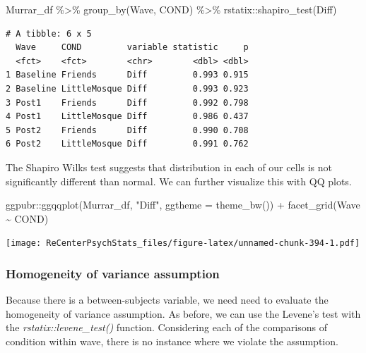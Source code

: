 \documentclass[
  11pt,
]{book}
\newenvironment{Shaded}{\begin{snugshade}}{\end{snugshade}}
\newcommand{\AttributeTok}[1]{\textcolor[rgb]{0.77,0.63,0.00}{#1}}
\newcommand{\FunctionTok}[1]{\textcolor[rgb]{0.00,0.00,0.00}{#1}}
\newcommand{\NormalTok}[1]{#1}
\newcommand{\SpecialCharTok}[1]{\textcolor[rgb]{0.00,0.00,0.00}{#1}}
\newcommand{\StringTok}[1]{\textcolor[rgb]{0.31,0.60,0.02}{#1}}
\begin{document}
\begin{Shaded}
\begin{Highlighting}[]
\NormalTok{Murrar\_df }\SpecialCharTok{\%\textgreater{}\%}
    \FunctionTok{group\_by}\NormalTok{(Wave, COND) }\SpecialCharTok{\%\textgreater{}\%}
\NormalTok{    rstatix}\SpecialCharTok{::}\FunctionTok{shapiro\_test}\NormalTok{(Diff)}
\end{Highlighting}
\end{Shaded}

\begin{verbatim}
# A tibble: 6 x 5
  Wave     COND         variable statistic     p
  <fct>    <fct>        <chr>        <dbl> <dbl>
1 Baseline Friends      Diff         0.993 0.915
2 Baseline LittleMosque Diff         0.993 0.923
3 Post1    Friends      Diff         0.992 0.798
4 Post1    LittleMosque Diff         0.986 0.437
5 Post2    Friends      Diff         0.990 0.708
6 Post2    LittleMosque Diff         0.991 0.762
\end{verbatim}

The Shapiro Wilks test suggests that distribution in each of our cells is not significantly different than normal. We can further visualize this with QQ plots.

\begin{Shaded}
\begin{Highlighting}[]
\NormalTok{ggpubr}\SpecialCharTok{::}\FunctionTok{ggqqplot}\NormalTok{(Murrar\_df, }\StringTok{"Diff"}\NormalTok{, }\AttributeTok{ggtheme =} \FunctionTok{theme\_bw}\NormalTok{()) }\SpecialCharTok{+} \FunctionTok{facet\_grid}\NormalTok{(Wave }\SpecialCharTok{\textasciitilde{}}
\NormalTok{    COND)}
\end{Highlighting}
\end{Shaded}

\texttt{[image: ReCenterPsychStats\_files/figure-latex/unnamed-chunk-394-1.pdf]}

\hypertarget{homogeneity-of-variance-assumption}{%
\subsubsection{Homogeneity of variance assumption}\label{homogeneity-of-variance-assumption}}

Because there is a between-subjects variable, we need need to evaluate the homogeneity of variance assumption. As before, we can use the Levene's test with the \emph{rstatix::levene\_test()} function. Considering each of the comparisons of condition within wave, there is no instance where we violate the assumption.
\end{document}

